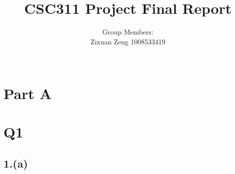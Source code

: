 \documentclass{article}
\title{CSC311 Project Final Report}
\author{Group Members: \\ Zixuan Zeng 1008533419 \\ \\ }
\begin{document}
\maketitle

\section*{Part A}

\section*{Q1}

\subsection*{1.(a)}
\end{document}
